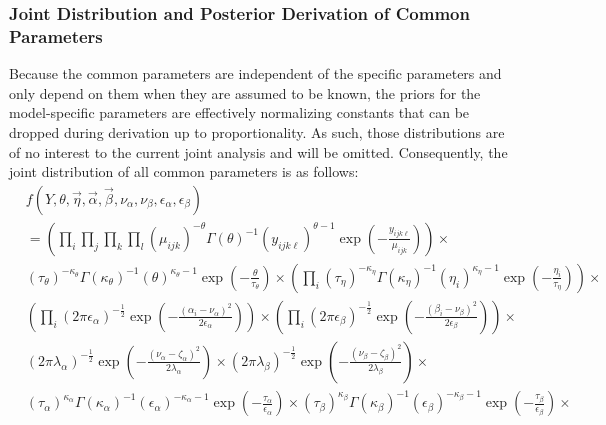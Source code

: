 \subsubsection{Joint Distribution and Posterior Derivation of Common Parameters}
Because the common parameters are independent of the specific
parameters and only depend on them when they are assumed to be known,
the priors for the model-specific parameters are effectively
normalizing constants that can be dropped during derivation up to
proportionality.  As such, those distributions are of no interest to
the current joint analysis and will be omitted.  Consequently, the
joint distribution of all common parameters is as follows:\\
\begin{eqnarray*}
&\displaystyle{f\left(Y,\theta,\vec{\eta},\vec{\alpha},\vec{\beta},\nu_\alpha,\nu_\beta,\epsilon_\alpha,\epsilon_\beta\right)}&\\
&\displaystyle{=\left(\prod_i\prod_j\prod_k\prod_l(\mu_{ijk})^{-\theta}\Gamma(\theta)^{-1}(y_{ijk\ell})^{\theta-1}\exp\left(-\frac{y_{ijk\ell}}{\mu_{ijk}}\right)\right)\times}&\\
&\displaystyle{(\tau_\theta)^{-\kappa_\theta}\Gamma(\kappa_\theta)^{-1}(\theta)^{\kappa_\theta-1}\exp\left(-\frac{\theta}{\tau_\theta}\right)\times\left(\prod_i(\tau_\eta)^{-\kappa_\eta}\Gamma(\kappa_\eta)^{-1}(\eta_i)^{\kappa_\eta-1}\exp\left(-\frac{\eta_i}{\tau_\eta}\right)\right)\times}&\\
&\displaystyle{\left(\prod_i(2\pi\epsilon_\alpha)^{-\frac{1}{2}}\exp\left(-\frac{(\alpha_i-\nu_\alpha)^2}{2\epsilon_\alpha}\right)\right)\times\left(\prod_i(2\pi\epsilon_\beta)^{-\frac{1}{2}}\exp\left(-\frac{(\beta_i-\nu_\beta)^2}{2\epsilon_\beta}\right)\right)\times}&\\
&\displaystyle{(2\pi\lambda_\alpha)^{-\frac{1}{2}}\exp\left(-\frac{(\nu_\alpha-\zeta_\alpha)^2}{2\lambda_\alpha}\right)\times(2\pi\lambda_\beta)^{-\frac{1}{2}}\exp\left(-\frac{(\nu_\beta-\zeta_\beta)^2}{2\lambda_\beta}\right)\times}&\\
&\displaystyle{(\tau_\alpha)^{\kappa_\alpha}\Gamma(\kappa_\alpha)^{-1}(\epsilon_\alpha)^{-\kappa_\alpha-1}\exp\left(-\frac{\tau_\alpha}{\epsilon_\alpha}\right)\times(\tau_\beta)^{\kappa_\beta}\Gamma(\kappa_\beta)^{-1}(\epsilon_\beta)^{-\kappa_\beta-1}\exp\left(-\frac{\tau_\beta}{\epsilon_\beta}\right)\times}&\\
\end{eqnarray*}

